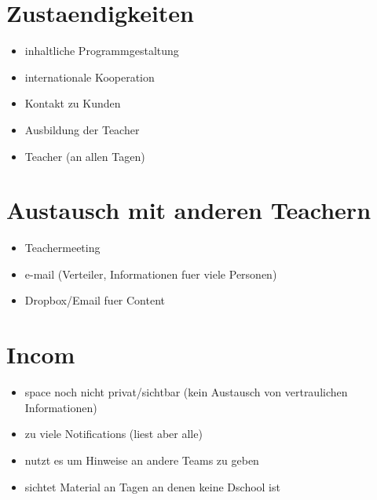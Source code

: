 \chapter{Zustaendigkeiten}
\label{zustaendigkeiten}

\begin{itemize}
\item inhaltliche Programmgestaltung

\item internationale Kooperation

\item Kontakt zu Kunden

\item Ausbildung der Teacher

\item Teacher (an allen Tagen)

\end{itemize}

\chapter{Austausch mit anderen Teachern}
\label{austauschmitanderenteachern}

\begin{itemize}
\item Teachermeeting

\item e-mail (Verteiler, Informationen fuer viele Personen)

\item Dropbox\slash Email fuer Content

\end{itemize}

\chapter{Incom}
\label{incom}

\begin{itemize}
\item space noch nicht privat\slash sichtbar (kein Austausch von vertraulichen Informationen)

\item zu viele Notifications (liest aber alle)

\item nutzt es um Hinweise an andere Teams zu geben

\item sichtet Material an Tagen an denen keine Dschool ist

\end{itemize}

